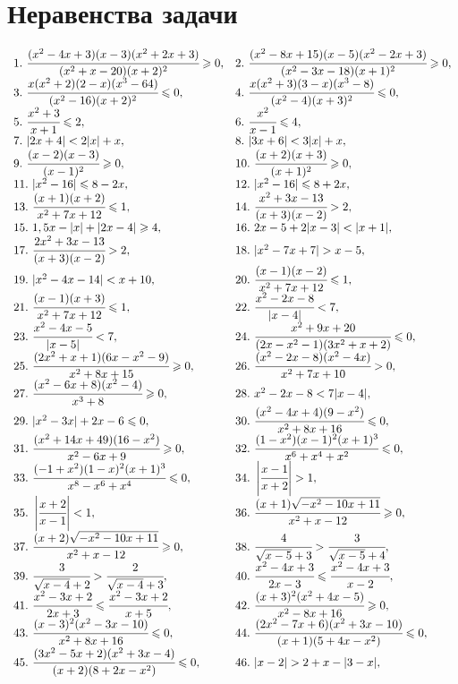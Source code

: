 \section{Неравенства задачи}
$\begin{array}{ll}
1.\ \cfrac{(x^2-4x+3)(x-3)(x^2+2x+3)}{(x^2+x-20)(x+2)^2}\geqslant0,&
2.\ \cfrac{(x^2-8x+15)(x-5)(x^2-2x+3)}{(x^2-3x-18)(x+1)^2}\geqslant0,\\
3.\ \cfrac{x(x^2+2)(2-x)(x^3-64)}{(x^2-16)(x+2)^2}\leqslant 0,&
4.\ \cfrac{x(x^2+3)(3-x)(x^3-8)}{(x^2-4)(x+3)^2}\leqslant 0,\\
5.\ \cfrac{x^2+3}{x+1}\leqslant2,&
6.\ \cfrac{x^2}{x-1}\leqslant4,\\
7.\ |2x+4|<2|x|+x,&
8.\ |3x+6|<3|x|+x,\\
9.\ \cfrac{(x-2)(x-3)}{(x-1)^2}\geqslant0,&
10.\ \cfrac{(x+2)(x+3)}{(x+1)^2}\geqslant0,\\
11.\ |x^2-16|\leqslant8-2x,&
12.\ |x^2-16|\leqslant8+2x,\\
13.\ \cfrac{(x+1)(x+2)}{x^2+7x+12}\leqslant1,&
14.\ \cfrac{x^2+3x-13}{(x+3)(x-2)}>2,\\
15.\ 1,5x-|x|+|2x-4|\geqslant4,&
16.\ 2x-5+2|x-3|<|x+1|,\\
17.\ \cfrac{2x^2+3x-13}{(x+3)(x-2)}>2,&
18.\ |x^2-7x+7|>x-5,\\
19.\ |x^2-4x-14|<x+10,&
20.\ \cfrac{(x-1)(x-2)}{x^2+7x+12}\leqslant1,\\
21.\ \cfrac{(x-1)(x+3)}{x^2+7x+12}\leqslant1,&
22.\ \cfrac{x^2-2x-8}{|x-4|}<7,\\
23.\ \cfrac{x^2-4x-5}{|x-5|}<7,&
24.\ \cfrac{x^2+9x+20}{(2x-x^2-1)(3x^2+x+2)}\leqslant0,\\
25.\ \cfrac{(2x^2+x+1)(6x-x^2-9)}{x^2+8x+15}\geqslant0,&
26.\ \cfrac{(x^2-2x-8)(x^2-4x)}{x^2+7x+10}>0,\\
27.\ \cfrac{(x^2-6x+8)(x^2-4)}{x^3+8}\geqslant0,&
28.\ x^2-2x-8<7|x-4|,\\
29.\ |x^2-3x|+2x-6\leqslant0,&
30.\ \cfrac{(x^2-4x+4)(9-x^2)}{x^2+8x+16}\leqslant0,\\
31.\ \cfrac{(x^2+14x+49)(16-x^2)}{x^2-6x+9}\geqslant0,&
32.\ \cfrac{(1-x^2)(x-1)^2(x+1)^3}{x^6+x^4+x^2}\leqslant0,\\
33.\ \cfrac{(-1+x^2)(1-x)^2(x+1)^3}{x^8-x^6+x^4}\leqslant0,&
34.\ \left|\cfrac{x-1}{x+2}\right|>1,\\
35.\ \left|\cfrac{x+2}{x-1}\right|<1,&
36.\ \cfrac{(x+1)\sqrt{-x^2-10x+11}}{x^2+x-12}\geqslant0,\\
37.\ \cfrac{(x+2)\sqrt{-x^2-10x+11}}{x^2+x-12}\geqslant0,&
38.\ \cfrac{4}{\sqrt{x-5}+3}>\cfrac{3}{\sqrt{x-5}+4},\\
39.\ \cfrac{3}{\sqrt{x-4}+2}>\cfrac{2}{\sqrt{x-4}+3},&
40.\ \cfrac{x^2-4x+3}{2x-3}\leqslant\cfrac{x^2-4x+3}{x-2},\\
41.\ \cfrac{x^2-3x+2}{2x+3}\leqslant\cfrac{x^2-3x+2}{x+5},&
42.\ \cfrac{(x+3)^2(x^2+4x-5)}{x^2-8x+16}\geqslant0,\\
43.\ \cfrac{(x-3)^2(x^2-3x-10)}{x^2+8x+16}\leqslant0,&
44.\ \cfrac{(2x^2-7x+6)(x^2+3x-10)}{(x+1)(5+4x-x^2)}\leqslant0,\\
45.\ \cfrac{(3x^2-5x+2)(x^2+3x-4)}{(x+2)(8+2x-x^2)}\leqslant0,&
46.\ |x-2|>2+x-|3-x|,\end{array}$\\
